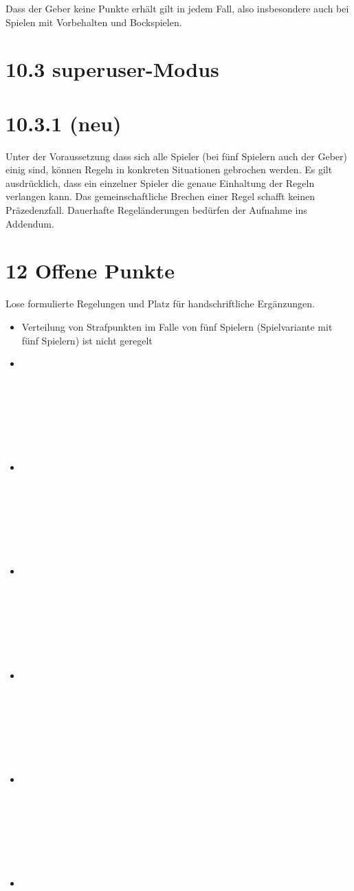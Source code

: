 Dass der Geber keine Punkte erhält gilt in jedem Fall, also insbesondere auch
bei Spielen mit Vorbehalten und Bockspielen.

\section*{10.3 superuser-Modus}

\section*{10.3.1 (neu)}

Unter der Voraussetzung dass sich alle Spieler (bei fünf Spielern auch der
Geber) einig sind, können Regeln in konkreten Situationen gebrochen werden. Es
gilt ausdrücklich, dass ein einzelner Spieler die genaue Einhaltung der Regeln
verlangen kann. Das gemeinschaftliche Brechen einer Regel schafft keinen
Präzedenzfall. Dauerhafte Regeländerungen bedürfen der Aufnahme ins Addendum.

\clearpage

\section*{12 Offene Punkte}

Lose formulierte Regelungen und Platz für handschriftliche Ergänzungen.

\begin{itemize}
    \item{Verteilung von Strafpunkten im Falle von fünf Spielern (Spielvariante
        mit fünf Spielern) ist nicht geregelt}
    \item{~\\~\\~\\~\\~\\~\\~}
    \item{~\\~\\~\\~\\~\\~\\~}
    \item{~\\~\\~\\~\\~\\~\\~}
    \item{~\\~\\~\\~\\~\\~\\~}
    \item{~\\~\\~\\~\\~\\~\\~}
    \item{}
\end{itemize}
